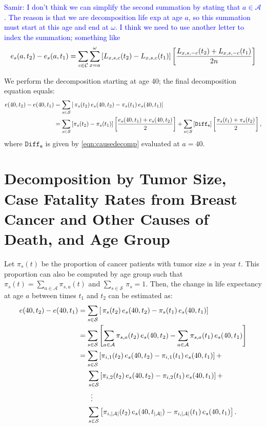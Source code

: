 \documentclass[11pt,letterpaper]{article}
\theoremstyle{plain}
\theoremstyle{remark}
\numberwithin{equation}{section}
\begin{document}
\textcolor{blue}{Samir: I don't think we can simplify the second summation by stating that $a\in\mathcal{A}$. The reason is that we are decomposition life exp at age $a$, so this summation must start at this age and end at $\omega$.  I think we need to use another letter to index the summation; something like
\begin{eqnarray}
e_s(a,t_2)-e_s(a,t_1)= \sum_{c\in\mathcal{C}}\sum_{x=a}^\omega \left[L_{x,s,c}(t_2)-L_{x,s,c}(t_1) \right] \left[\frac{L_{x,s,-c}(t_2)+L_{x,s,-c}(t_1) }{2n} \right] \notag
\end{eqnarray} }

We perform the decomposition starting at age 40; the final
decomposition equation equals:
\begin{align*}
  e(40,t_2)-e(40,t_1)&=\sum_{s\in\mathcal{S}}\left[\,\pi_s(t_2)\,e_s(40,t_2)- \pi_s(t_1)\,e_s(40,t_1)\right] \notag \\
                     &=\sum_{s\in\mathcal{S}}\left[\pi_s(t_2)-\pi_s(t_1) \right]\left[\frac{e_s(40,t_1)+e_s(40,t_2)}{2}\right]+\sum_{s\in\mathcal{S}}\left[\mathtt{Diff_e} \right]\left[\frac{\pi_s(t_1)+\pi_s(t_2)}{2}\right],
\end{align*}
where $\mathtt{Diff_e}$ is given by \eqref{eqn:causedecomp} evaluated at $a=40$.\\


\section{Decomposition by Tumor Size, Case Fatality Rates from
  Breast Cancer and Other Causes of Death, and Age Group}
Let $\pi_{s}(t)$ be the proportion of cancer patients with tumor size
$s$ in year $t$. This proportion can also be computed by age group
such that $\pi_s(t)=\sum_{a\in\mathcal{A}}\pi_{s,a}(t)$ and
$\sum_{s\in\mathcal{S}}\,\pi_s=1$.  Then, the
change in life expectancy at age $a$ between times $t_1$ and $t_2$ can
be estimated as:
\begin{align*}
  e(40,t_2)-e(40,t_1)&=\sum_{s\in\mathcal{S}}\left[\,\pi_s(t_2)\,e_s(40,t_2)- \pi_s(t_1)\,e_s(40,t_1)\right] \\
                     &=\sum_{s\in\mathcal{S}} \left[\sum_{a\in\mathcal{A}}\pi_{s,a}(t_2)\,e_s(40,t_2)- \sum_{a\in\mathcal{A}}\pi_{s,a}(t_1)\,e_s(40,t_1) \right]\\
                     &=\sum_{s\in\mathcal{S}}\left[\pi_{i,1}(t_2)\,e_s(40,t_2)-
                       \pi_{i,1}(t_1)\,e_s(40,t_1)\right] +\\
                     &\hspace{0.18in}\sum_{s\in\mathcal{S}}\left[\pi_{i,2}(t_2)\,e_s(40,t_2)- \pi_{i,2}(t_1)\,e_s(40,t_1)\right] + \\
  &\phantom{=\Sigma}\vdots \\
                     &\hspace{0.18in}\sum_{s\in\mathcal{S}}\left[\pi_{i,\left\vert\mathcal{A}\right\vert}(t_2)\,e_s(40,t_{\left\vert\mathcal{A}\right\vert})- \pi_{i,\left\vert\mathcal{A}\right\vert}(t_1)\,e_s(40,t_1)\right]. \notag 
 \end{align*}
\end{document}
